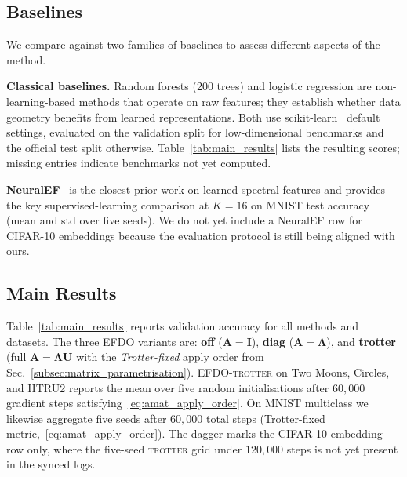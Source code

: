 \documentclass{article}
\theoremstyle{plain}
\theoremstyle{definition}
\theoremstyle{remark}
\begin{document}
\subsection{Baselines}

We compare against two families of baselines to assess different aspects of the method.

\textbf{Classical baselines.}
Random forests (200 trees) and logistic regression are non-learning-based methods that operate on raw features; they establish whether data geometry benefits from learned representations.
Both use scikit-learn~\citep{scikit-learn} default settings, evaluated on the validation split for low-dimensional benchmarks and the official test split otherwise.
Table~\ref{tab:main_results} lists the resulting scores; missing entries indicate benchmarks not yet computed.

\textbf{NeuralEF}~\citep{pmlr-v162-deng22b} is the closest prior work on learned spectral features and provides the key supervised-learning comparison at $K{=}16$ on MNIST test accuracy (mean and std over five seeds).
We do not yet include a NeuralEF row for CIFAR-10 embeddings because the evaluation protocol is still being aligned with ours.

\subsection{Main Results}

Table~\ref{tab:main_results} reports validation accuracy for all methods and datasets.
The three EFDO variants are:
\textbf{off} ($\mathbf{A}{=}\mathbf{I}$),
\textbf{diag} ($\mathbf{A}{=}\boldsymbol{\Lambda}$), and
\textbf{trotter} (full $\mathbf{A}{=}\boldsymbol{\Lambda}\mathbf{U}$ with the \emph{Trotter-fixed} apply order from Sec.~\ref{subsec:matrix_parametrisation}).
EFDO-\textsc{trotter} on Two Moons, Circles, and HTRU2 reports the mean over five random initialisations after $60{,}000$ gradient steps satisfying~\eqref{eq:amat_apply_order}.
On MNIST multiclass we likewise aggregate five seeds after $60{,}000$ total steps (Trotter-fixed metric,~\eqref{eq:amat_apply_order}).
The dagger marks the CIFAR-10 embedding row only, where the five-seed \textsc{trotter} grid under $120{,}000$ steps is not yet present in the synced logs.
\end{document}
